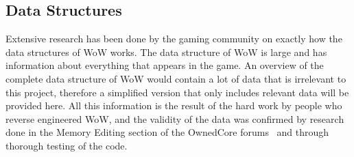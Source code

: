 

	
	
	

\subsection{Data Structures}

Extensive research has been done by the gaming community on exactly how the data structures of WoW works. The data structure of WoW is large and has information about everything that appears in the game. An overview of the complete data structure of WoW would contain a lot of data that is irrelevant to this project, therefore a simplified version that only includes relevant data will be provided here. All this information is the result of the hard work by people who reverse engineered WoW, and the validity of the data was confirmed by research done in the Memory Editing section of the OwnedCore forums~\cite{objman} and through thorough testing of the code.

